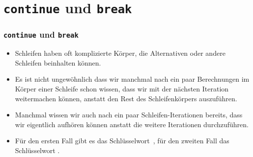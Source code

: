 \documentclass[aspectratio=169,mathserif,notheorems]{beamer}%
\begin{document}
\section{\texttt{continue} und \texttt{break}}%
%
\begin{frame}%
\frametitle{\texttt{continue} und \texttt{break}}%
\begin{itemize}%
\item Schleifen haben oft komplizierte Körper, die Alternativen oder andere Schleifen beinhalten können.%
%
\item<2-> Es ist nicht ungewöhnlich dass wir manchmal nach ein paar Berechnungen im Körper einer Schleife schon wissen, dass wir mit der nächsten Iteration weitermachen können, anstatt den Rest des Schleifenkörpers auszuführen.%
%
\item<3-> Manchmal wissen wir auch nach ein paar Schleifen-Iterationen bereits, dass wir eigentlich aufhören können anstatt die weitere Iterationen durchzuführen.%
%
\item<4-> Für den ersten Fall gibt es das Schlüsselwort~, für den zweiten Fall das Schlüsselwort \cite{PSF:P3D:TPT:MCFT}.%
\end{itemize}%
\end{frame}%
%
\end{document}
